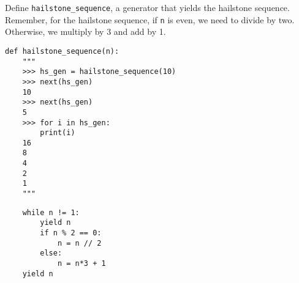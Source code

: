 \begin{blocksection}
\question Define \lstinline$hailstone_sequence$, a generator that yields the hailstone sequence. Remember, 
for the hailstone sequence, if \lstinline$n$ is even, we need to divide by two. 
Otherwise, we multiply by 3 and add by 1.

\begin{lstlisting}
def hailstone_sequence(n):
    """
    >>> hs_gen = hailstone_sequence(10)
    >>> next(hs_gen)
    10
    >>> next(hs_gen)
    5
    >>> for i in hs_gen:
   	    print(i)
    16
    8
    4
    2
    1
    """
\end{lstlisting}

\begin{solution}[1.5in]
\begin{lstlisting}
    while n != 1:
        yield n
        if n % 2 == 0:
            n = n // 2
        else:
            n = n*3 + 1
    yield n
\end{lstlisting}
\end{solution}
\end{blocksection}
